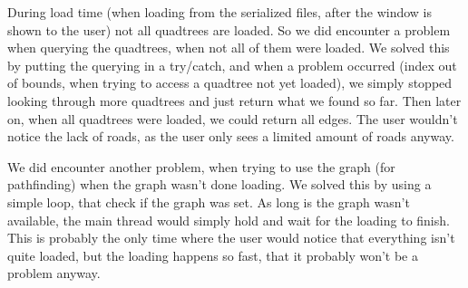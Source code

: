 During load time (when loading from the serialized files, after the window is shown to the 
user) not all quadtrees are loaded. So we did encounter a problem when querying the 
quadtrees, when not all of them were loaded. We solved this by putting the querying in 
a try/catch, and when a problem occurred (index out of bounds, when trying to access a 
quadtree not yet loaded), we simply stopped looking through more quadtrees and just 
return what we found so far. Then later on, when all quadtrees were loaded, we could 
return all edges. The user wouldn't notice the lack of roads, as the user only sees a limited 
amount of roads anyway.

We did encounter another problem, when trying to use the graph (for pathfinding) when the 
graph wasn't done loading. We solved this by using a simple loop, that check if the graph was 
set. As long is the graph wasn't available, the main thread would simply hold and wait for the 
loading to finish. This is probably the only time where the user would notice that everything isn't 
quite loaded, but the loading happens so fast, that it probably won't be a problem anyway.
